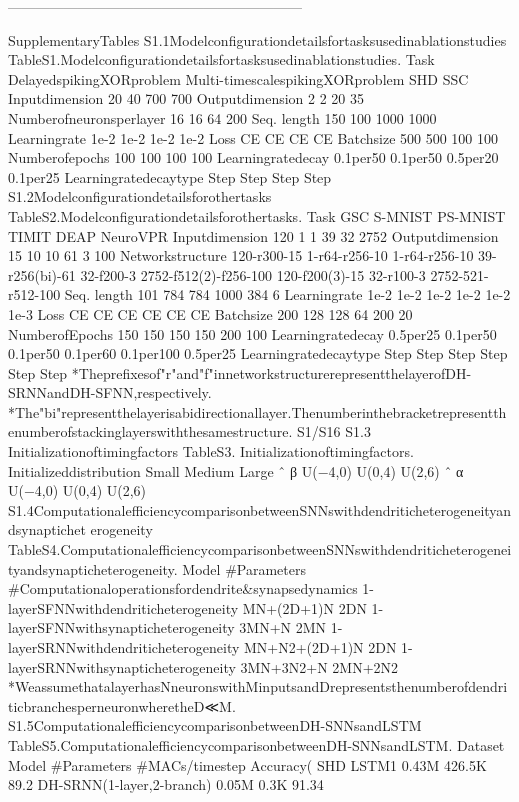 ---------------------------------------------------------------

SupplementaryTables
 S1.1Modelconfigurationdetailsfortasksusedinablationstudies
 TableS1.Modelconfigurationdetailsfortasksusedinablationstudies.
 Task DelayedspikingXORproblem Multi-timescalespikingXORproblem SHD SSC
 Inputdimension 20 40 700 700
 Outputdimension 2 2 20 35
 Numberofneuronsperlayer 16 16 64 200
 Seq. length 150 100 1000 1000
 Learningrate 1e-2 1e-2 1e-2 1e-2
 Loss CE CE CE CE
 Batchsize 500 500 100 100
 Numberofepochs 100 100 100 100
 Learningratedecay 0.1per50 0.1per50 0.5per20 0.1per25
 Learningratedecaytype Step Step Step Step
 S1.2Modelconfigurationdetailsforothertasks
 TableS2.Modelconfigurationdetailsforothertasks.
 Task GSC S-MNIST PS-MNIST TIMIT DEAP NeuroVPR
 Inputdimension 120 1 1 39 32 2752
 Outputdimension 15 10 10 61 3 100
 Networkstructure 120-r300-15 1-r64-r256-10 1-r64-r256-10 39-r256(bi)-61 32-f200-3 2752-f512(2)-f256-100
 120-f200(3)-15 32-r100-3 2752-521-r512-100
 Seq. length 101 784 784 1000 384 6
 Learningrate 1e-2 1e-2 1e-2 1e-2 1e-2 1e-3
 Loss CE CE CE CE CE CE
 Batchsize 200 128 128 64 200 20
 NumberofEpochs 150 150 150 150 200 100
 Learningratedecay 0.5per25 0.1per50 0.1per50 0.1per60 0.1per100 0.5per25
 Learningratedecaytype Step Step Step Step Step Step
 *Theprefixesof"r"and"f"innetworkstructurerepresentthelayerofDH-SRNNandDH-SFNN,respectively.
 *The"bi"representthelayerisabidirectionallayer.Thenumberinthebracketrepresentthenumberofstackinglayerswiththesamestructure.
 S1/S16
S1.3 Initializationoftimingfactors
 TableS3. Initializationoftimingfactors.
 Initializeddistribution Small Medium Large
 ˆ β U(−4,0) U(0,4) U(2,6)
 ˆ α U(−4,0) U(0,4) U(2,6)
 S1.4ComputationalefficiencycomparisonbetweenSNNswithdendriticheterogeneityandsynaptichet
erogeneity
 TableS4.ComputationalefficiencycomparisonbetweenSNNswithdendriticheterogeneityandsynapticheterogeneity.
 Model #Parameters #Computationaloperationsfordendrite&synapsedynamics
 1-layerSFNNwithdendriticheterogeneity MN+(2D+1)N 2DN
 1-layerSFNNwithsynapticheterogeneity 3MN+N 2MN
 1-layerSRNNwithdendriticheterogeneity MN+N2+(2D+1)N 2DN
 1-layerSRNNwithsynapticheterogeneity 3MN+3N2+N 2MN+2N2
 *WeassumethatalayerhasNneuronswithMinputsandDrepresentsthenumberofdendriticbranchesperneuronwheretheD≪M.
 S1.5ComputationalefficiencycomparisonbetweenDH-SNNsandLSTM
 TableS5.ComputationalefficiencycomparisonbetweenDH-SNNsandLSTM.
 Dataset Model #Parameters #MACs/timestep Accuracy(%
 SHD LSTM1 0.43M 426.5K 89.2%
 DH-SRNN(1-layer,2-branch) 0.05M 0.3K 91.34%
